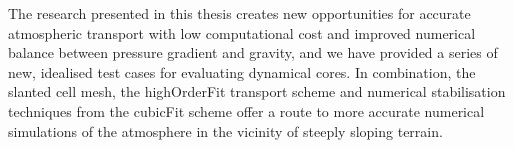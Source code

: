 The research presented in this thesis creates new opportunities for accurate atmospheric transport with low computational cost and improved numerical balance between pressure gradient and gravity, and we have provided a series of new, idealised test cases for evaluating dynamical cores.
In combination, the slanted cell mesh, the highOrderFit transport scheme and numerical stabilisation techniques from the cubicFit scheme offer a route to more accurate numerical simulations of the atmosphere in the vicinity of steeply sloping terrain.
